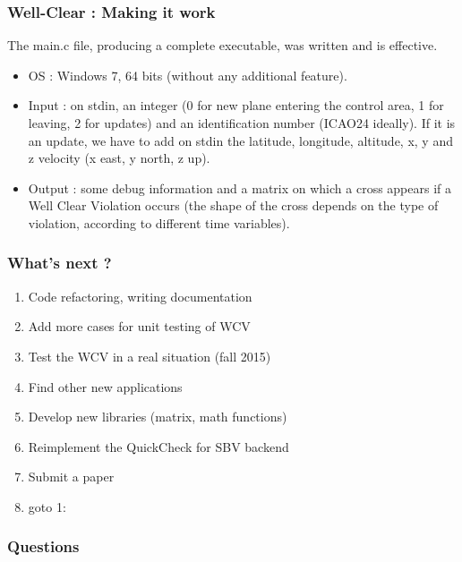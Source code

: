 \documentclass{beamer}
\begin{document}
\begin{frame}[fragile]
	\frametitle{Well-Clear : Making it work}
	
	The main.c file, producing a complete executable, was written and is effective.
	\begin{itemize}
		\item OS : Windows 7, 64 bits (without any additional feature).
		\item Input : on stdin, an integer (0 for new plane entering the control area, 1 for leaving, 2 for updates) and an identification number (ICAO24 ideally). If it is an update, we have to add on stdin the latitude, longitude, altitude, x, y and z velocity (x east, y north, z up).
		\item Output : some debug information and a matrix on which a cross appears if a Well Clear Violation occurs (the shape of the cross depends on the type of violation, according to different time variables).
	\end{itemize}
	
\end{frame}


\begin{frame}
	\frametitle{What's next ?}
	\begin{enumerate}
		\item Code refactoring, writing documentation
		\item Add more cases for unit testing of WCV
		\item Test the WCV in a real situation (fall 2015)
		\item Find other new applications
		\item Develop new libraries (matrix, math functions)
		\item Reimplement the QuickCheck for SBV backend
		\item Submit a paper
		\item goto 1:
	\end{enumerate}
\end{frame}

\begin{frame}
	\frametitle{Questions}
\end{frame}
  	
\end{document}
